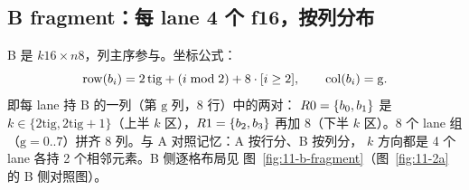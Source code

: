 \subsection{B fragment：每 lane 4 个 f16，按列分布}

B 是 $k16 \times n8$，列主序参与。坐标公式：
\begin{equation}
  \mathrm{row}(b\sb i) = 2\,\mathrm{tig} + (i \bmod 2) + 8\cdot[i \ge 2],
  \qquad \mathrm{col}(b\sb i) = \mathrm{g}.
  \label{eq:11-bpos}
\end{equation}
即每 lane 持 B 的一列（第 $\mathrm{g}$ 列，8 行）中的两对：
$R0 = \{b\sb 0,b\sb 1\}$ 是 $k \in \{2\mathrm{tig}, 2\mathrm{tig}{+}1\}$（上半
$k$ 区），$R1 = \{b\sb 2,b\sb 3\}$ 再加 8（下半 $k$ 区）。8 个 lane 组
（$\mathrm{g} = 0..7$）拼齐 8 列。与 A 对照记忆：A 按行分、B 按列分，
$k$ 方向都是 4 个 lane 各持 2 个相邻元素。B 侧逐格布局见
图~\ref{fig:11-b-fragment}（图~\ref{fig:11-2a} 的 B 侧对照图）。

